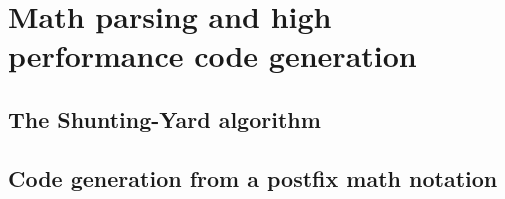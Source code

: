 \documentclass[../main]{subfiles}
\begin{document}
\section{
  Math parsing and high performance code generation
}

\subsection{
  The Shunting-Yard algorithm
}

\subsection{
  Code generation from a postfix math notation
}
\end{document}
